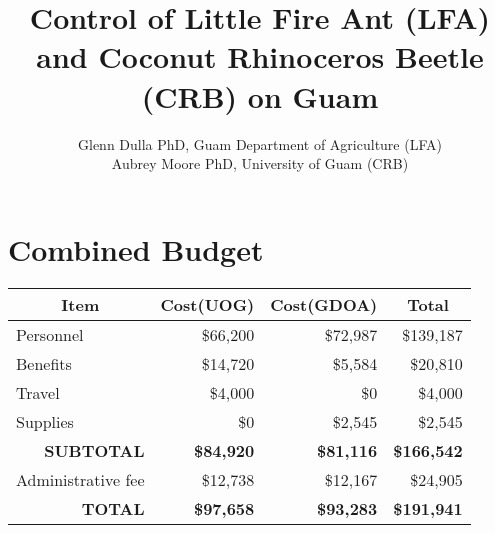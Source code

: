 \documentclass[12pt,letterpaper,english,bibliography=totocnumbered, abstract=on]{scrartcl}
\begin{document}
\titlehead{Grant Proposal: USDA Forest Service FY2020}

\title{Control of Little Fire Ant (LFA) and Coconut Rhinoceros Beetle (CRB) on Guam}

\author{Glenn Dulla PhD, Guam Department of Agriculture (LFA)\\
	Aubrey Moore PhD, University of Guam (CRB)}


\maketitle
\newpage
\tableofcontents

\pagebreak

\section{Combined Budget}

\begin{table}[h]
	\centering
	\begin{tabular}{@{}lrrr@{}}
		\toprule
		\multicolumn{1}{c}{\textbf{Item}} & \multicolumn{1}{c}{\textbf{Cost(UOG)}} & \multicolumn{1}{c}{\textbf{Cost(GDOA)}} & \multicolumn{1}{c}{\textbf{Total}} \\ 
		\midrule
		Personnel & \$66,200 & \$72,987 & \$139,187 \\
		Benefits & \$14,720 & \$5,584 & \$20,810 \\
		Travel & \$4,000 & \$0 & \$4,000 \\
		Supplies & \$0 & \$2,545 & \$2,545 \\ 
		\midrule
		\multicolumn{1}{r}{\textbf{SUBTOTAL}} & \textbf{\$84,920} & \textbf{\$81,116} & \textbf{\$166,542} \\ \midrule
		Administrative fee & \$12,738 & \$12,167 & \$24,905 \\ \midrule
		\multicolumn{1}{r}{\textbf{TOTAL}} & \textbf{\$97,658} & \textbf{\$93,283} & \textbf{\$191,941} \\ \bottomrule
	\end{tabular}
\end{table}
\end{document}
